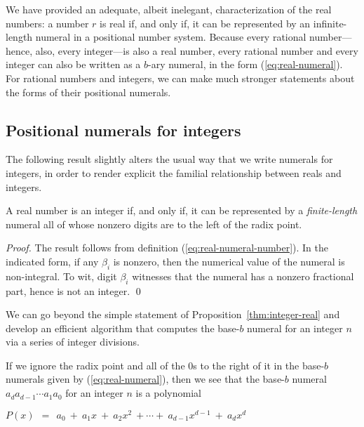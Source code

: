 We have provided an adequate, albeit inelegant, characterization of
the real numbers: a number $r$ is real if, and only if, it can be
represented by an infinite-length numeral in a positional number
system.  Because every rational number---hence, also, every
integer---is also a real number, every rational number and every
integer can also be written as a $b$-ary numeral, in the form
(\ref{eq:real-numeral}).  For rational numbers and integers, we can
make much stronger statements about the forms of their positional
numerals.


\subsection{Positional numerals for integers}
\label{sec:special-numerals-N}

The following result slightly alters the usual way that we write
numerals for integers, in order to render explicit the familial
relationship between reals and integers.

\begin{prop}
\label{thm:integer-real}
A real number is an integer if, and only if, it can be represented by
a {\em finite-length} numeral all of whose nonzero digits are to the
left of the radix point.
\end{prop}

\begin{proof}
The result follows from definition (\ref{eq:real-numeral-number}).  In
the indicated form, if any $\beta_i$ is nonzero, then the numerical
value of the numeral is non-integral.  To wit, digit $\beta_i$
witnesses that the numeral has a nonzero fractional part, hence is not
an integer.  \qed
\end{proof}

We can go beyond the simple statement of
Proposition~\ref{thm:integer-real} and develop an efficient algorithm
that computes the base-$b$ numeral for an integer $n$ via a series of
integer divisions.

\bigskip

%
If we ignore the radix point and all of the $0$s to the right of it in
the base-$b$ numerals given by (\ref{eq:real-numeral}), then we see
that the base-$b$ numeral $a_d a_{d-1} \cdots a_1 a_0$ for an integer
$n$ is a polynomial

$P(x) \ \ = \ \ a_0 \ + \ a_1 x \ + \ a_2 x^2 \ + \cdots + \ a_{d-1}
x^{d-1} \ + \ a_d x^d$

